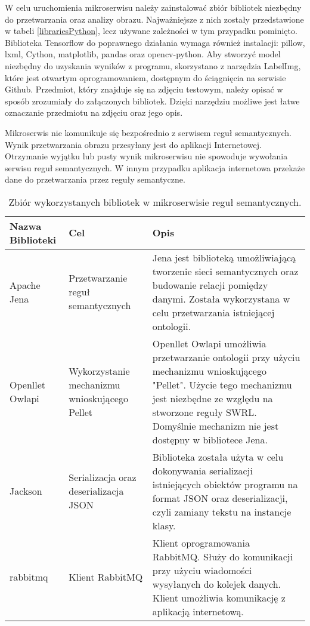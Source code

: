 W celu uruchomienia mikroserwisu należy zainstalować zbiór bibliotek niezbędny do przetwarzania oraz analizy obrazu. Najważniejsze z nich zostały przedstawione w tabeli \ref{librariesPython}, lecz używane zależności w tym przypadku pominięto. Biblioteka Tensorflow do poprawnego działania wymaga również instalacji: pillow, lxml, Cython, matplotlib, pandas oraz opencv-python. Aby stworzyć model niezbędny do uzyskania wyników z programu, skorzystano z narzędzia LabelImg, które jest otwartym oprogramowaniem, dostępnym do ściągnięcia na serwisie Github. Przedmiot, który znajduje się na zdjęciu testowym, należy opisać w sposób zrozumiały do załączonych bibliotek. Dzięki narzędziu możliwe jest łatwe oznaczanie przedmiotu na zdjęciu oraz jego opis. 

Mikroserwis nie komunikuje się bezpośrednio z serwisem reguł semantycznych. Wynik przetwarzania obrazu przesyłany jest do aplikacji Internetowej. Otrzymanie wyjątku lub pusty wynik mikroserwisu nie spowoduje wywołania serwisu reguł semantycznych. W innym przypadku aplikacja internetowa przekaże dane do przetwarzania przez reguły semantyczne. 


\begin{center}
	\begin{longtable}{ | p{3.1cm} | p{4cm} | p{6.5cm} |}
		\caption{Zbiór wykorzystanych bibliotek w mikroserwisie reguł semantycznych.}
		\label{librariesJava} \\
		\hline Nazwa \newline Biblioteki & Cel & Opis \\ \hline    
		
		\hline Apache Jena &
		Przetwarzanie reguł semantycznych
		
		& Jena jest biblioteką umożliwiającą tworzenie sieci semantycznych oraz budowanie relacji pomiędzy danymi. Została wykorzystana w celu przetwarzania istniejącej ontologii. \\ \hline


		\hline Openllet Owlapi &
		Wykorzystanie mechanizmu wnioskującego Pellet
		
		& Openllet Owlapi umożliwia przetwarzanie ontologii przy użyciu mechanizmu wnioskującego "Pellet". Użycie tego mechanizmu jest niezbędne ze względu na stworzone reguły SWRL. Domyślnie mechanizm nie jest dostępny w bibliotece Jena.  \\ \hline		
		
		\hline Jackson &
		Serializacja oraz deserializacja JSON
		
		& Biblioteka została użyta w celu dokonywania serializacji istniejących obiektów programu na format JSON oraz deserializacji, czyli zamiany tekstu na instancje klasy.\\ \hline
		
		\hline rabbitmq &
		Klient RabbitMQ
	
		& Klient oprogramowania RabbitMQ. Służy do komunikacji przy użyciu wiadomości wysyłanych do kolejek danych. Klient umożliwia komunikację z aplikacją internetową.\\ \hline

	\end{longtable}
\end{center}

